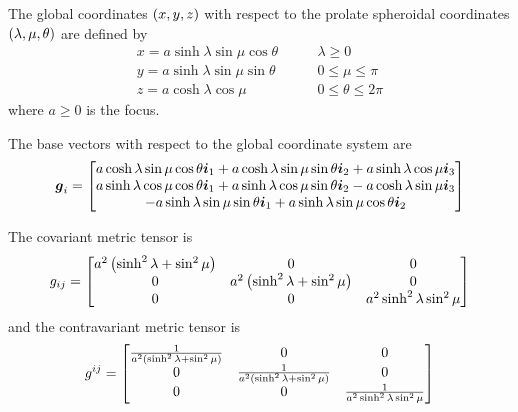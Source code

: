 The global coordinates $\left( x,y,z \right)$ with respect to the prolate spheroidal
coordinates $\left( \lambda,\mu,\theta \right)$ are defined by
\begin{equation}
  \begin{aligned}
    x = a\sinh\lambda\sin\mu\cos\theta & \qquad \lambda \ge 0 \\
    y = a\sinh\lambda\sin\mu\sin\theta & \qquad 0 \le \mu \le \pi \\
    z = a\cosh\lambda\cos\mu & \qquad 0 \le \theta \le 2\pi 
  \end{aligned}
\end{equation}
where $a\ge0$ is the focus.

The base vectors with respect to the global coordinate system are
\begin{equation}
  \vect{g}_{i}=\begin{bmatrix} 
    a\cosh\lambda\sin\mu\cos\theta\vect{i}_{1}+a\cosh\lambda\sin\mu\sin\theta\vect{i}_{2}+a\sinh\lambda\cos\mu\vect{i}_{3}\\ 
    a\sinh\lambda\cos\mu\cos\theta\vect{i}_{1}+a\sinh\lambda\cos\mu\sin\theta\vect{i}_{2}-a\cosh\lambda\sin\mu\vect{i}_{3}\\
    -a\sinh\lambda\sin\mu\sin\theta\vect{i}_{1}+a\sinh\lambda\sin\mu\cos\theta\vect{i}_{2}
  \end{bmatrix}
\end{equation}

The covariant metric tensor is
\begin{equation}
  g_{ij}=\begin{bmatrix}
    a^{2}\left( \sinh^{2}\lambda+\sin^{2}\mu \right) & 0 & 0 \\
    0 & a^{2}\left( \sinh^{2}\lambda+\sin^{2}\mu \right) & 0 \\
    0 & 0 & a^{2}\sinh^{2}\lambda\sin^{2}\mu 
  \end{bmatrix}
\end{equation}
and the contravariant metric tensor is
\begin{equation}
  g^{ij}=\begin{bmatrix}
    \frac{1}{a^{2}\left( \sinh^{2}\lambda+\sin^{2}\mu \right)}& 0 & 0 \\
    0 & \frac{1}{a^{2}\left( \sinh^{2}\lambda+\sin^{2}\mu \right)} & 0 \\
    0 & 0 & \frac{1}{a^{2}\sinh^{2}\lambda\sin^{2}\mu} 
  \end{bmatrix}
\end{equation}

